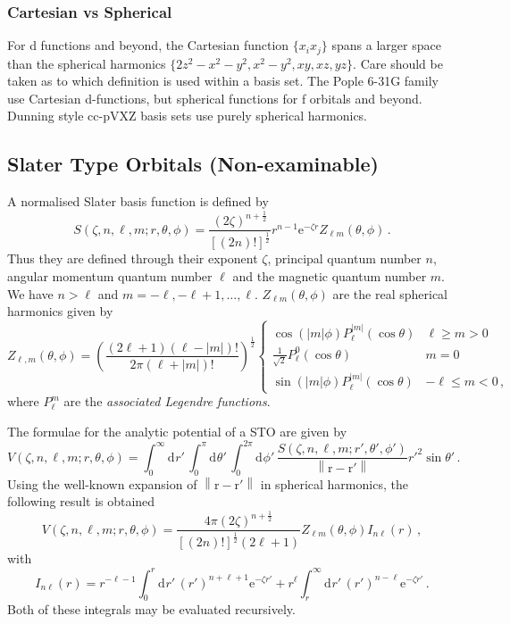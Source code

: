 \documentclass{article}
\theoremstyle{plain}\theoremheaderfont{\normalfont\itshape}\theorembodyfont{\rmfamily}\theoremseparator{.}\newtheorem*{rem}{Remark}\newtheorem*{ex}{Example}\newtheorem*{proof}{Proof}\newtheorem*{altp}{Alternative proof}
\theoremstyle{plain}\theoremheaderfont{\normalfont\bfseries}\theorembodyfont{\rmfamily}\theoremseparator{.}\newtheorem{thm}{Theorem}[section]\newtheorem{lem}[thm]{Lemma}\newtheorem{prop}[thm]{Proposition}\newtheorem*{cor}{Corollary}\newtheorem{defn}[thm]{Definition}\newtheorem{clm}[thm]{Claim}\newtheorem{clminproof}{Claim}
\theoremstyle{break}\theoremheaderfont{\normalfont\itshape}\theorembodyfont{\rmfamily}\theoremseparator{.\medskip}\newtheorem*{proofskip}{Proof}\newtheorem*{exs}{Examples}\newtheorem*{rems}{Remarks}
\theoremstyle{break}\theoremheaderfont{\normalfont\bfseries}\theorembodyfont{\rmfamily}\theoremseparator{.\medskip}\newtheorem{lemskip}[thm]{Lemma}\newtheorem{defnskip}[thm]{Definition}\newtheorem{propskip}[thm]{Proposition}\newtheorem{thmskip}[thm]{Theorem}
\numberwithin{equation}{section}
\newcommand{\e}{\mathrm{e}}
\newcommand{\dd}[2][]{\mathrm{d}^{#1} #2\,}
\newcommand{\vb}[1]{\bm{\mathrm{#1}}}
\newcommand{\abs}[1]{\left| #1 \right|}
\newcommand{\norm}[1]{\left\| #1 \right\|}
\begin{document}
    \subsubsection{Cartesian vs Spherical}
    For d functions and beyond, the Cartesian function \(\{x_ix_j\}\) spans a larger space than the spherical harmonics \(\{2z^2-x^2-y^2,x^2-y^2,xy,xz,yz\}\). Care should be taken as to which definition is used within a basis set. The Pople 6-31G family use Cartesian d-functions, but spherical functions for f orbitals and beyond. Dunning style cc-pVXZ basis sets use purely spherical harmonics.
    \subsection{Slater Type Orbitals (Non-examinable)}
    A normalised Slater basis function is defined by
    \begin{equation}
        S(\zeta,n,\ell,m;r,\theta,\phi)=\frac{(2\zeta)^{n+\frac{1}{2}}}{[(2n)!]^{\frac{1}{2}}}r^{n-1}\e^{-\zeta r}Z_{\ell m}(\theta,\phi)\,.
    \end{equation}
    Thus they are defined through their exponent \(\zeta\), principal quantum number \(n\), angular momentum quantum number \(\ell\) and the magnetic quantum number \(m\). We have \(n>\ell\) and \(m=-\ell,-\ell+1,\dots,\ell\). \(Z_{\ell m}(\theta,\phi)\) are the real spherical harmonics given by
    \begin{equation}
        Z_{\ell,m}(\theta,\phi)=\left(\frac{(2\ell+1)(\ell-\abs{m})!}{2\pi(\ell+\abs{m})!}\right)^{\frac{1}{2}}\begin{cases}
            \cos(\abs{m}\phi)P_{\ell}^{\abs{m}}(\cos\theta) & \ell\ge m>0\\
            \frac{1}{\sqrt{2}}P_{\ell}^{0}(\cos\theta) & m=0\\
            \sin(\abs{m}\phi)P_{\ell}^{\abs{m}}(\cos\theta) & -\ell\le m<0\,,
        \end{cases}
    \end{equation}
    where \(P_\ell^m\) are the \textit{associated Legendre functions}.

    The formulae for the analytic potential of a STO are given by
    \begin{equation}
        V(\zeta,n,\ell,m;r,\theta,\phi)=\int_{0}^{\infty}\dd{r'}\int_{0}^{\pi}\dd{\theta'}\int_{0}^{2\pi}\dd{\phi'}\frac{S(\zeta,n,\ell,m;r',\theta',\phi')}{\norm{\vb{r}-\vb{r}'}}r'^2\sin\theta'\,.
    \end{equation}
    Using the well-known expansion of \(\norm{\vb{r}-\vb{r}'}\) in spherical harmonics, the following result is obtained
    \begin{equation}
        V(\zeta,n,\ell,m;r,\theta,\phi)=\frac{4\pi(2\zeta)^{n+\frac{1}{2}}}{[(2n)!]^{\frac{1}{2}}(2\ell+1)}Z_{\ell m}(\theta,\phi)I_{n\ell}(r)\,,
    \end{equation}
    with
    \begin{equation}
        I_{n\ell}(r)=r^{-\ell-1}\int_{0}^{r}\dd{r'}(r')^{n+\ell+1}\e^{-\zeta r'}+r^{\ell}\int_{r}^{\infty}\dd{r'}(r')^{n-\ell}\e^{-\zeta r'}\,.
    \end{equation}
    Both of these integrals may be evaluated recursively.
\end{document}
